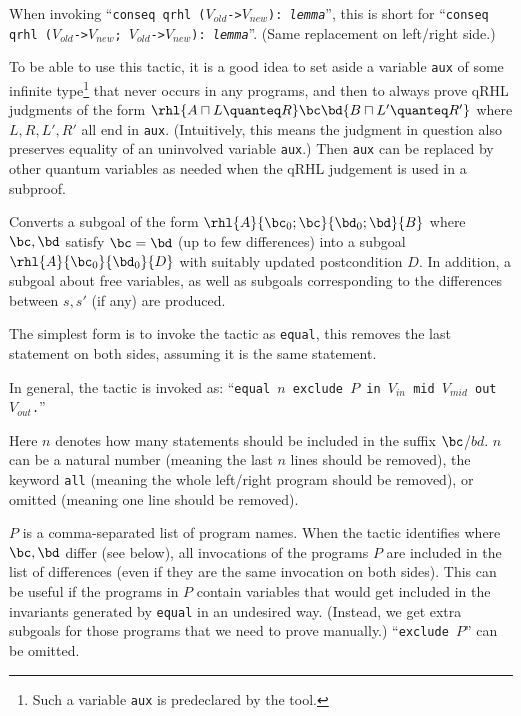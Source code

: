 \documentclass{article}
\begin{document}
When invoking ``\texttt{conseq qrhl
  ($V_\mathit{old}$->$V_\mathit{new}$): \textit{lemma}}'', this is
short for ``\texttt{conseq qrhl ($V_\mathit{old}$->$V_\mathit{new}$;
  $V_\mathit{old}$->$V_\mathit{new}$): \textit{lemma}}''. (Same
replacement on left/right side.)

To be able to use this tactic, it is a good idea to set aside a
variable \texttt{aux} of some infinite type\footnote{Such a variable
  \texttt{aux} is predeclared by the tool.} that never occurs in any
programs, and then to always prove qRHL judgments of the form
$\rhl{A \sqcap L\quanteq R}\bc\bd {B \sqcap L'\quanteq R'}$ where
$L,R,L',R'$ all end in \texttt{aux}. (Intuitively, this means the
judgment in question also preserves equality of an uninvolved variable
\texttt{aux}.) Then \texttt{aux} can be replaced by other quantum
variables as needed when the qRHL judgement is used in a subproof.



Converts a subgoal of the form
$\rhl{A}{\bc_0;\bc}{\bd_0;\bd}{B}$
where $\bc,\bd$ satisfy $\bc=\bd$ (up to few differences)
into a subgoal $\rhl{A}{\bc_0}{\bd_0}{D}$
with suitably updated postcondition $D$.
In addition, a subgoal about free variables,
as well as subgoals corresponding to the differences between $s,s'$ (if any) are produced.

The simplest form is to invoke the tactic as \texttt{equal}, this
removes the last statement on both sides, assuming it is the same
statement.

In general, the tactic is invoked as: ``\texttt{equal $n$ exclude $P$
  in $V_\mathit{in}$ mid $V_\mathit{mid}$ out $V_\mathit{out}$.}''

Here $n$ denotes how many statements should be included in the suffix
$\bc$/$bd$. $n$ can be a natural number (meaning the last $n$ lines
should be removed), the keyword \texttt{all} (meaning the whole
left/right program should be removed), or omitted (meaning one line
should be removed).

$P$ is a comma-separated list of program names. When the tactic
identifies where $\bc,\bd$ differ (see below), all invocations of the
programs $P$ are included in the list of differences (even if they are
the same invocation on both sides). This can be useful if the programs
in $P$ contain variables that would get included in the invariants
generated by \texttt{equal} in an undesired way. (Instead, we get
extra subgoals for those programs that we need to prove manually.)
``\texttt{exclude $P$}'' can be omitted.
\end{document}
